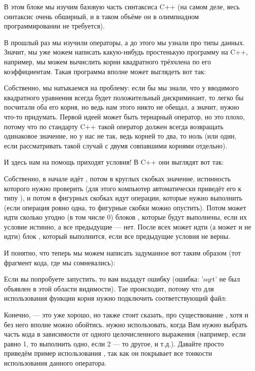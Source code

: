 В этом блоке мы изучим базовую часть синтаксиса C++ (на самом деле, весь синтаксис очень обширный, и в таком объёме он в олимпиадном программировании не требуется).

В прошлый раз мы изучили операторы, а до этого мы узнали про типы данных. Значит, мы уже можем написать какую-нибудь простенькую программу на C++, например, мы можем вычислить корни квадратного трёхчлена по его коэффициентам. Такая программа вполне может выглядеть вот так:


Собственно, мы натыкаемся на проблему: если бы мы знали, что у вводимого квадратного уравнения всегда будет положительный дискриминант, то легко бы посчитали оба его корня, но ведь нам этого никто не обещал, а значит, нужно что-то придумать. Первой идеей может быть тернарный оператор, но это плохо, потому что по стандарту C++ такой оператор должен всегда возвращать одинаковое значение, но у нас не так, ведь корней то два, то ноль (или один, если рассматривать такой случай с двумя совпавшими корнями отдельно).

И здесь нам на помощь приходят условия! В C++ они выглядят вот так:


Собственно, в начале идёт  , потом в круглых скобках значение, истинность которого нужно проверить (для этого компьютер автоматически приведёт его к типу ), и потом в фигурных скобках идут операции, которые нужно выполнить (если операция ровно одна, то фигурные скобки можно опустить). Потом может идти сколько угодно (в том числе 0) блоков , которые будут выполнены, если их условие истинно, а все предыдущие — нет. После всех  может идти (а может и не идти) блок , который выполнится, если все предыдущие условия не верны.

И понятно, что теперь мы можем написать задуманное вот таким образом (тот фрагмент кода, где мы сомневались):


Если вы попробуете запустить, то вам выдадут ошибку  (ошибка: 'sqrt' не был объявлен в этой области видимости). Тае происходит, потому что для использования функции корня нужно подключить соответствующий файл:


Конечно,  — это уже хорошо, но также стоит сказать, про существование , хотя и без него вполне можно обойтись.  нужно использовать, когда Вам нужно выбрать часть кода в зависимости от одного целочисленного выражения (например, если  равно 1, то выполнить одно, если 2 — то другое, и т.д.). Давайте просто приведём пример использования , так как он покрывает все тонкости использования данного оператора.

